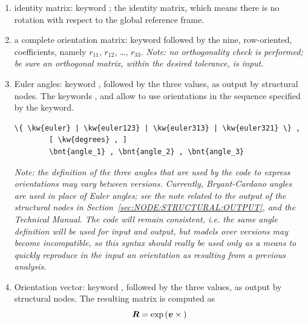 \begin{enumerate}
\item identity matrix: keyword ; the identity matrix,
which means there is no rotation with respect to the global reference
frame.

\item a complete orientation matrix: keyword 
followed by the nine, row-oriented, coefficients, namely
$ r_{11} $, $ r_{12} $, \ldots, $ r_{33} $.
\emph{Note: no orthogonality check is performed; be sure an orthogonal
matrix, within the desired tolerance, is input}.

\item Euler angles: keyword , followed by the three
values, as output by structural nodes.
The keywords ,  and 
allow to use orientations in the sequence specified by the keyword.
\begin{Verbatim}[commandchars=\\\{\}]
    \{ \kw{euler} | \kw{euler123} | \kw{euler313} | \kw{euler321} \} ,
        [ \kw{degrees} , ]
        \bnt{angle_1} , \bnt{angle_2} , \bnt{angle_3}
\end{Verbatim}

\emph{Note: the definition of the three angles that are used 
by the code to express orientations may vary between versions.
Currently, Bryant-Cardano angles are used in place of Euler
angles; see the note related to the output of the structural nodes
in Section~\ref{sec:NODE:STRUCTURAL:OUTPUT}, and the Technical Manual.
The code will remain consistent, i.e. the same angle
definition will be used for input and output, but models
over versions may become incompatible, so this syntax should 
really be used only as a means to quickly reproduce in the input
an orientation as resulting from a previous analysis.}

\item Orientation vector: keyword , followed by the three
values, as output by structural nodes.
The resulting matrix is computed as
\begin{equation}
	\boldsymbol{R} = \exp\left( \boldsymbol{v}\times{} \right)
\end{equation}
\end{enumerate}

